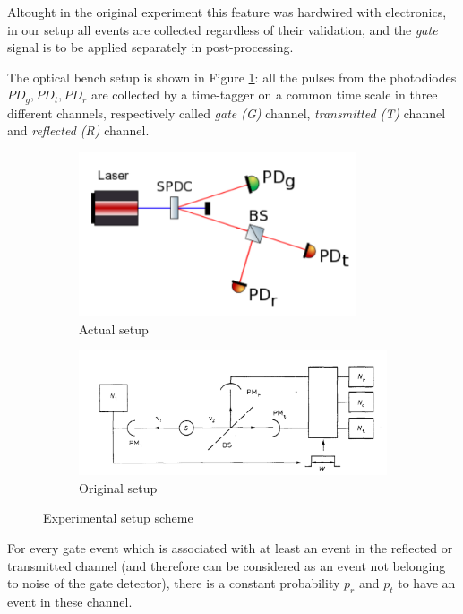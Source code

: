 \documentclass[10pt, final]{article}
\begin{document}
\begin{multicols}{2}
Altought in the original experiment this feature was hardwired with electronics, in our setup all events are collected regardless of their validation, and the \emph{gate} signal is to be applied separately in post-processing.

The optical bench setup is shown in Figure \ref{our}: all the pulses from the photodiodes $PD_g, PD_t, PD_r$ are collected by a time-tagger on a common time scale in three different channels, respectively called \emph{gate (G)} channel, \emph{transmitted (T)} channel and \emph{reflected (R)} channel.


\begin{mdframed}
    \begin{figure}[H]
        \begin{subfigure}{\textwidth}
            \centering
            \includegraphics[width = 0.9\textwidth]{../images/our_setup.png}
            \caption{Actual setup}
            \label{our}
        \end{subfigure}

        \begin{subfigure}{\textwidth}
            \centering
            \includegraphics[width = \textwidth]{../images/original.png}
            \caption{Original setup}
        \end{subfigure}
        \caption{Experimental setup scheme}
    \end{figure}
\end{mdframed}
For every gate event which is associated with at least an event in the reflected or transmitted channel (and therefore can be considered as an event not belonging to noise of the gate detector), there is a constant probability $p_r$ and $p_t$ to have an event in these channel.


\end{multicols}
\end{document}

